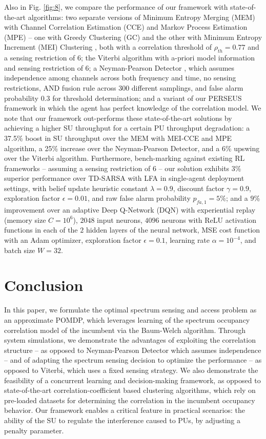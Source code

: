 \documentclass[10pt,twocolumn]{IEEEtran}
\begin{document}
Also in Fig. \ref{fig:8}, we compare the performance of our framework with state-of-the-art algorithms: two separate versions of Minimum Entropy Merging (MEM) with Channel Correlation Estimation (CCE) and Markov Process Estimation (MPE) -- one with Greedy Clustering (GC) and the other with Minimum Entropy Increment (MEI) Clustering \cite{6956794}, both with a correlation threshold of $\rho_{th}{=}0.77$ and a sensing restriction of $6$; the Viterbi algorithm \cite{4554696} with a-priori model information and sensing restriction of $6$; a Neyman-Pearson Detector \cite{5167826}, which assumes independence among channels across both frequency and time, no sensing restrictions, AND fusion rule across 300 different samplings, and false alarm probability $0.3$ for threshold determination; and a variant of our PERSEUS framework in which the agent has perfect knowledge of the correlation model. We note that our framework out-performs these state-of-the-art solutions by achieving a higher SU throughput for a certain PU throughput degradation: a 37.5\% boost in SU throughput over the MEM with MEI-CCE and MPE algorithm, a 25\% increase over the Neyman-Pearson Detector, and a 6\% upswing over the Viterbi algorithm. Furthermore, bench-marking against existing RL frameworks -- assuming a sensing restriction of $6$ -- our solution exhibits $3$\% superior performance over TD-SARSA with LFA \cite{6507570} in single-agent deployment settings, with belief update heuristic constant $\lambda{=}0.9$, discount factor $\gamma{=}0.9$, exploration factor $\epsilon{=}0.01$, and raw false alarm probability $p_{fa,1}{=}5\%$; and a $9$\% improvement over an adaptive Deep Q-Network (DQN) \cite{DQN} with experiential replay (memory size $C{=}10^{6}$), $2048$ input neurons, $4096$ neurons with ReLU activation functions in each of the $2$ hidden layers of the neural network, MSE cost function with an Adam optimizer, exploration factor $\epsilon{=}0.1$, learning rate $\alpha{=}10^{-4}$, and batch size $W{=}32$.
\vspace{-4mm}

\section{Conclusion}\label{V}
In this paper, we formulate the optimal spectrum sensing and access problem as an approximate POMDP, which leverages learning of the spectrum occupancy correlation model of the incumbent via the Baum-Welch algorithm. Through system simulations, we demonstrate the advantages of exploiting the correlation structure -- as opposed to Neyman-Pearson Detector which assumes independence -- and of adapting the spectrum sensing decision to optimize the performance -- as opposed to Viterbi, which uses a fixed sensing strategy. We also demonstrate the feasibility of a concurrent learning and decision-making framework, as opposed to state-of-the-art correlation-coefficient based clustering algorithms, which rely on pre-loaded datasets for determining the correlation in the incumbent occupancy behavior. Our framework enables a critical feature in practical scenarios: the ability of the SU to regulate the interference caused to PUs, by adjusting a penalty parameter.
\vspace{-6mm}


\end{document}
